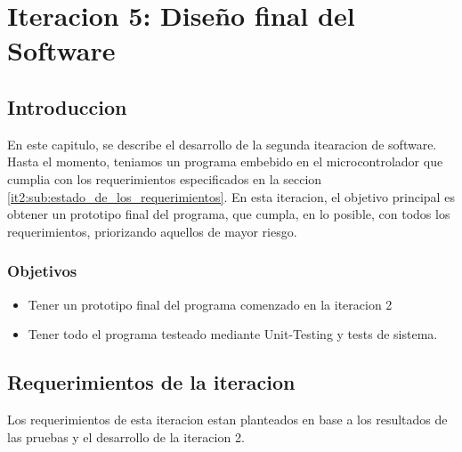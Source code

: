 \chapter{Iteracion 5: Diseño final del Software} %
\label{cha:iteracion_5}

\section{Introduccion} %
\label{it5:sec:introduccion}

En este capitulo, se describe el desarrollo de la segunda itearacion de software. Hasta el momento, teniamos un programa embebido en el microcontrolador que cumplia con los requerimientos especificados en la seccion \ref{it2:sub:estado_de_los_requerimientos}. En esta iteracion, el objetivo principal es obtener un prototipo final del programa, que cumpla, en lo posible, con todos los requerimientos, priorizando aquellos de mayor riesgo.


\subsection{Objetivos} %
\label{it5:ssec:objetivos}

\begin{itemize}
  \item Tener un prototipo final del programa comenzado en la iteracion 2
  \item Tener todo el programa testeado mediante Unit-Testing y tests de sistema.
\end{itemize}


\section{Requerimientos de la iteracion} %
\label{it5:sec:requerimientos_de_la_iteracion}

Los requerimientos de esta iteracion estan planteados en base a los resultados de las pruebas y el desarrollo de la iteracion 2. 

